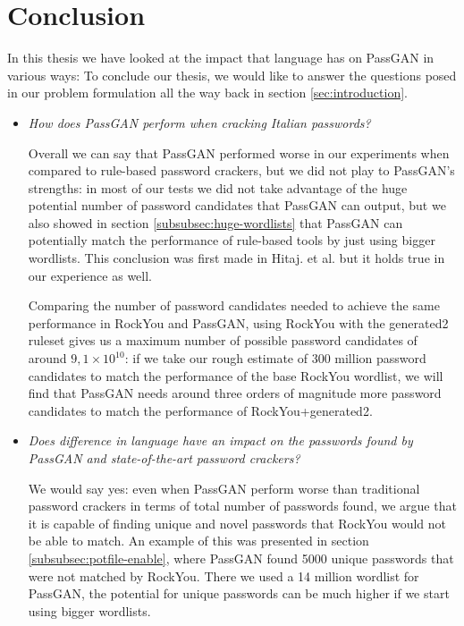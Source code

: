 \section{Conclusion}
In this thesis we have looked at the impact that language has on PassGAN in various ways:
To conclude our thesis, we would like to answer the questions posed in our problem formulation all the way back in section \ref{sec:introduction}.

\begin{itemize}
\item \emph{How does PassGAN perform when cracking Italian passwords?} %

Overall we can say that PassGAN performed worse in our experiments when compared to rule-based password crackers, but we did not play to PassGAN's strengths: in most of our tests we did not take advantage of the huge potential number of password candidates that PassGAN can output, but we also showed in section \ref{subsubsec:huge-wordlists} that PassGAN can potentially match the performance of rule-based tools by just using bigger wordlists. This conclusion was first made in Hitaj. et al. but it holds true in our experience as well. 

Comparing the number of password candidates needed to achieve the same performance in RockYou and PassGAN, using RockYou with the generated2 ruleset gives us a maximum number of possible password candidates of around $9,1\times10^{10}$: if we take our rough estimate of 300 million password candidates to match the performance of the base RockYou wordlist, we will find that PassGAN needs around three orders of magnitude more password candidates to match the performance of RockYou+generated2.   


\item \emph{Does difference in language have an impact on the passwords found by PassGAN and state-of-the-art password crackers?}

We would say yes: even when PassGAN perform worse than traditional password crackers in terms of total number of passwords found, we argue that it is capable of finding unique and novel passwords that RockYou would not be able to match. An example of this was presented in section \ref{subsubsec:potfile-enable}, where PassGAN found 5000 unique passwords that were not matched by RockYou. There we used a 14 million wordlist for PassGAN, the potential for unique passwords can be much higher if we start using bigger wordlists.    


\end{itemize}

